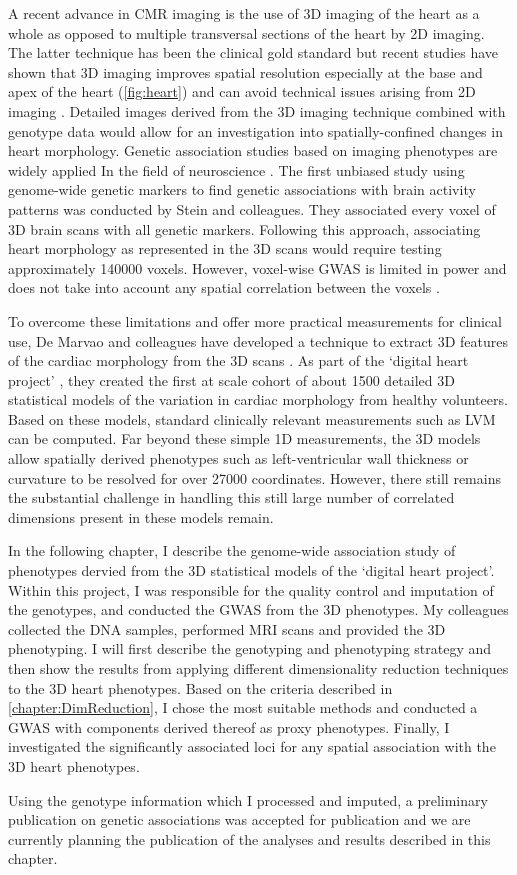 A recent advance in CMR imaging is the use of 3D imaging of the heart as a whole as opposed to multiple transversal sections of the heart by 2D imaging. The latter technique has been the clinical gold standard but recent studies have shown that 3D imaging improves spatial resolution especially at the base and apex of the heart (\cref{fig:heart}) and can avoid technical issues arising from 2D imaging \citep{deMarvao2014}. Detailed images derived from the 3D imaging technique combined with genotype data would allow for an investigation into spatially-confined changes in heart morphology. Genetic association studies based on imaging phenotypes are widely applied In the field of neuroscience \citep{Filippini2009,Ho2010,Jahanshad2013,Hibar2015}. The first unbiased study using genome-wide genetic markers to find genetic associations with brain activity patterns was conducted by Stein and colleagues. They associated every voxel of 3D brain scans with all genetic markers. Following this approach, associating heart morphology as represented in the 3D scans would require testing approximately \num{140000} voxels. However, voxel-wise GWAS is limited in power and does not take into account any spatial correlation between the voxels \citep{Ge2014}. 

To overcome these limitations and offer more practical measurements for clinical use, De Marvao and colleagues have developed a technique to extract 3D features of the cardiac morphology from the 3D scans \citep{deMarvao2014}. As part of the `digital heart project' \citep{Cook2010}, they created the first at scale cohort of about \num{1500} detailed 3D statistical models of the variation in cardiac morphology from healthy volunteers. Based on these models, standard clinically relevant measurements such as LVM can be computed. Far beyond these simple 1D measurements, the 3D models allow spatially derived phenotypes such as left-ventricular wall thickness or curvature to be resolved for over \num{27000} coordinates. However, there still remains the substantial challenge in handling this still large number of correlated dimensions present in these models remain.

In the following chapter, I describe the genome-wide association study of phenotypes dervied from the 3D statistical models of the `digital heart project'. Within this project, I was responsible for the quality control and imputation of the genotypes, and conducted the GWAS from the 3D phenotypes. My colleagues collected the DNA samples, performed MRI scans and provided the 3D phenotyping. I will first describe the genotyping and phenotyping strategy and then show the results from applying different dimensionality reduction techniques to the 3D heart phenotypes. Based on the criteria described in \cref{chapter:DimReduction}, I chose the most suitable methods and conducted a GWAS with components derived thereof as proxy phenotypes. Finally, I investigated the significantly associated loci for any spatial association with the 3D heart phenotypes.

Using the genotype information which I processed and imputed, a preliminary publication on genetic associations was accepted for publication \citep{Biffi2017} and we are currently planning the publication of the analyses and results described in this chapter.


